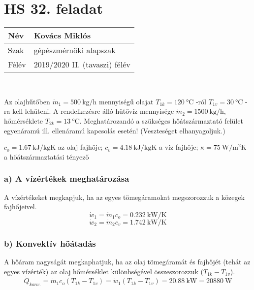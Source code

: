 \section*{HS 32. feladat} 

\begin{tabular}{ | p{2cm} | p{14cm} | } 
	\hline
	Név & Kovács Miklós \\ 
	\hline
	Szak & gépészmérnöki alapszak \\ 
	\hline
	Félév & 2019/2020 II. (tavaszi) félév \\ 
	\hline
\end{tabular}\\
\vspace{5mm}

Az olajhűtőben $\dot{m}_1 = \SI{500}{\kilogram\per\hour}$ mennyiségű olajat $T_{1k} = \SI{120}{\celsius}$ -ról $T_{1v} = \SI{30}{\celsius}$ -ra kell lehűteni. A rendelkezésre álló hűtővíz mennyisége $\dot{m}_2 = \SI{1500}{\kilogram\per\hour}$, hőmérséklete $T_{2k} = \SI{13}{\celsius}$. Meghatározandó a szükséges hőátszármaztató felület egyenáramú ill. ellenáramú kapcsolás esetén! (Veszteséget elhanyagoljuk.)

$c_o = \SI{1,67}{\kilo\joule\per\kilogram\kelvin}$ az olaj fajhője;
$c_v = \SI{4,18}{\kilo\joule\per\kilogram\kelvin}$ a víz fajhője;
$\kappa = \SI{75}{\watt\per\meter\squared\kelvin}$ a hőátszármaztatási tényező

\subsubsection*{a) A vízértékek meghatározása }
A vízértékeket megkapjuk, ha az egyes tömegáramokat megszorozzuk a közegek fajhőjeivel.
\begin{equation}
\dot{w}_1 = \dot{m}_1 c_o = \SI{0,232}{\kilo\watt\per\kelvin}
\end{equation}
\begin{equation}
\dot{w}_2 = \dot{m}_2 c_v = \SI{1,742}{\kilo\watt\per\kelvin}
\end{equation}

\subsubsection*{b) Konvektív hőátadás }
A hőáram nagyságát megkaphatjuk, ha az olaj tömegáramát és fajhőjét (tehát az egyes vízérték) az olaj hőmérséklet különbségével összeszorozzuk ($T_{1k} - T_{1v}$).
\begin{equation}
\dot{Q}_{konv.} = \dot{m}_1 c_o (T_{1k} - T_{1v}) = \dot{w}_1  (T_{1k} - T_{1v}) =\SI{20,88}{\kilo\watt} =\SI{20880}{\watt}
\end{equation}

